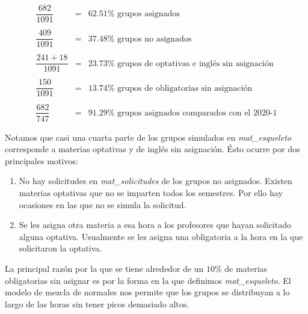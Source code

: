 \begin{eqnarray*}
\dfrac{682}{1091} &=& 62.51\% \text{ grupos asignados}\\\\
\dfrac{409}{1091} &=& 37.48\% \text{ grupos no asignados}\\\\
\dfrac{241 + 18}{1091} &=& 23.73\% \text{ grupos de optativas e inglés sin asignación}\\\\
\dfrac{150}{1091} &=& 13.74\% \text{ grupos de obligatorias sin asignación}\\\\ %
\dfrac{682}{747} &=& 91.29\% \text{ grupos asignados comparados con el 2020-1}
\end{eqnarray*}


Notamos que casi una cuarta parte de los grupos simulados en \textit{mat\_esqueleto} corresponde a materias optativas y de inglés sin asignación. Ésto ocurre por dos principales motivos:

\begin{enumerate}
\item No hay solicitudes en \textit{mat\_solicitudes} de los grupos no asignados. Existen materias optativas que no se imparten todos los semestres. Por ello hay ocasiones en las que no se simula la solicitud.

\item Se les asigna otra materia a esa hora a los profesores que hayan solicitado alguna optativa. Usualmente se les asigna una obligatoria a la hora en la que solicitaron la optativa.
\end{enumerate}

La principal razón por la que se tiene alrededor de un $10\%$ de materias obligatorias sin asignar es por la forma en la que definimos \textit{mat\_esqueleto}. El modelo de mezcla de normales nos permite que los grupos se distribuyan a lo largo de las horas sin tener picos demasiado altos.

